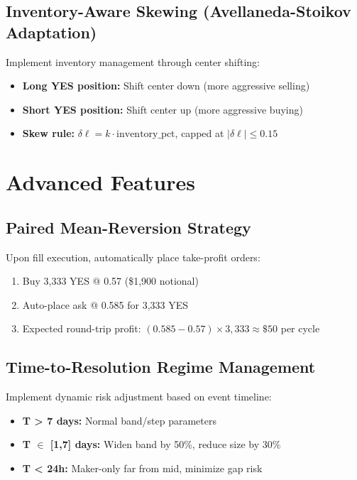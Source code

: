 \documentclass[11pt]{article}
\begin{document}
\subsection{Inventory-Aware Skewing (Avellaneda-Stoikov Adaptation)}

Implement inventory management through center shifting:
\begin{itemize}
    \item \textbf{Long YES position:} Shift center down (more aggressive selling)
    \item \textbf{Short YES position:} Shift center up (more aggressive buying)
    \item \textbf{Skew rule:} $\delta\ell = k \cdot \text{inventory\_pct}$, capped at $|\delta\ell| \leq 0.15$
\end{itemize}

\section{Advanced Features}

\subsection{Paired Mean-Reversion Strategy}

Upon fill execution, automatically place take-profit orders:
\begin{enumerate}
    \item Buy 3,333 YES @ 0.57 (\$1,900 notional)
    \item Auto-place ask @ 0.585 for 3,333 YES
    \item Expected round-trip profit: $(0.585 - 0.57) \times 3,333 \approx \$50$ per cycle
\end{enumerate}

\subsection{Time-to-Resolution Regime Management}

Implement dynamic risk adjustment based on event timeline:
\begin{itemize}
    \item \textbf{T > 7 days:} Normal band/step parameters
    \item \textbf{T $\in$ [1,7] days:} Widen band by 50\%, reduce size by 30\%
    \item \textbf{T < 24h:} Maker-only far from mid, minimize gap risk
\end{itemize}
\end{document}
